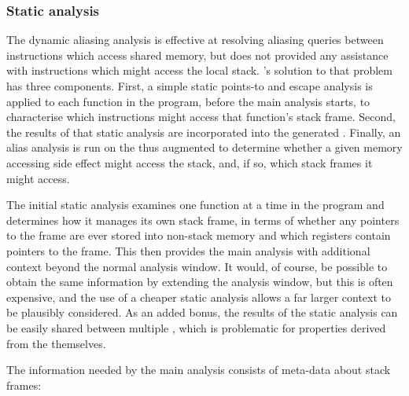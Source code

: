 
\subsubsection{Static analysis}

\label{sect:static_analysis}



The dynamic aliasing analysis is effective at resolving aliasing
queries between instructions which access shared memory, but does not
provided any assistance with instructions which might access the local
stack.  {\Technique}'s solution to that problem has three components.
First, a simple static points-to and escape analysis is applied to
each function in the program, before the main analysis starts, to
characterise which instructions might access that function's stack
frame.  Second, the results of that static analysis are incorporated
into the generated {\StateMachines}.  Finally, an alias analysis is
run on the thus augmented {\StateMachines} to determine whether a
given memory accessing side effect might access the stack, and, if so,
which stack frames it might access.

The initial static analysis examines one function at a time in the
program and determines how it manages its own stack frame, in terms of
whether any pointers to the frame are ever stored into non-stack
memory and which registers contain pointers to the frame.  This then
provides the main analysis with additional context beyond the normal
analysis window.  It would, of course, be possible to obtain the same
information by extending the analysis window, but this is often
expensive, and the use of a cheaper static analysis allows a far
larger context to be plausibly considered.  As an added bonus, the
results of the static analysis can be easily shared between multiple
{\StateMachines}, which is problematic for properties derived from the
{\StateMachines} themselves.

The information needed by the main analysis consists of meta-data
about stack frames:

